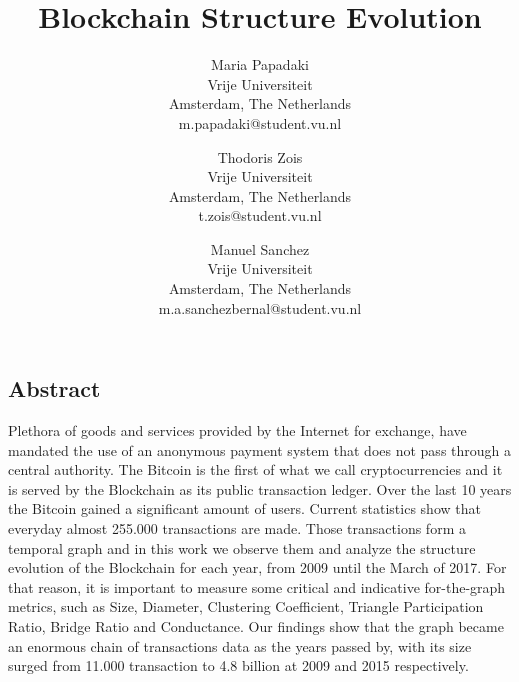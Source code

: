 \documentclass[letterpaper,twocolumn,10pt]{article}
\begin{document}
\date{}


\newcommand{\fref}[1]{\mbox{Figure~\ref{#1}}}
\newcommand{\secref}[1]{\mbox{Section~\ref{#1}}}
\newcommand{\tref}[1]{\mbox{Table~\ref{#1}}}



\newcommand{\exect}{\emph{Execution Metric}}
\newcommand{\name}{\emph{Blah}}

\title{\Large \bf Blockchain Structure Evolution}

\author{
	Maria Papadaki\\
	Vrije Universiteit\\
	Amsterdam, The Netherlands\\
	m.papadaki@student.vu.nl
	\and
	Thodoris Zois\\
	Vrije Universiteit\\
	Amsterdam, The Netherlands\\
	t.zois@student.vu.nl
	\and
	Manuel Sanchez\\
	Vrije Universiteit\\
	Amsterdam, The Netherlands\\
	m.a.sanchezbernal@student.vu.nl
}

\maketitle

\thispagestyle{empty}

\subsection*{Abstract}

Plethora of goods and services provided by the Internet for exchange, have mandated the use of an anonymous payment system that does not pass through a central authority. The Bitcoin is the first of what we call cryptocurrencies and it is served by the Blockchain as its public transaction ledger. 
Over the last 10 years the Bitcoin gained a significant amount of users. Current statistics show that everyday almost 255.000 transactions are made.
Those transactions form a temporal graph and in this work we observe them and analyze the structure evolution of the Blockchain for each year, from 2009 until the March of 2017. For that reason, it is important to measure some critical and indicative for-the-graph metrics, such as Size, Diameter, Clustering Coefficient, Triangle Participation Ratio, Bridge Ratio and Conductance. Our findings show that the graph became an enormous chain of transactions data as the years passed by, with its size surged from 11.000 transaction to 4.8 billion at 2009 and 2015 respectively.
\end{document}
